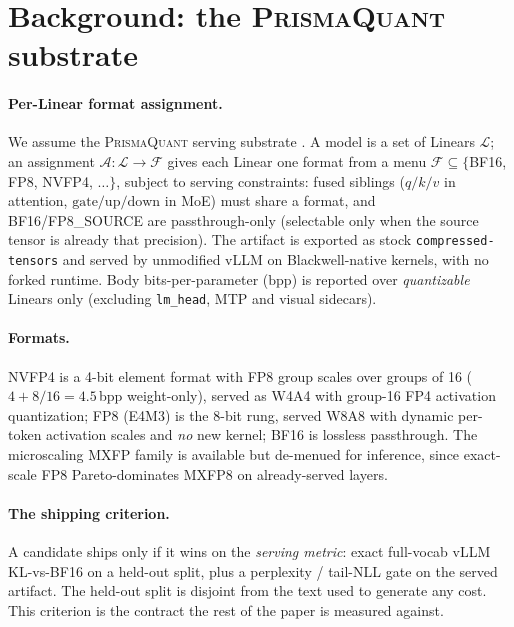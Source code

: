 \documentclass[11pt]{article}
\theoremstyle{plain}
\theoremstyle{definition}
\newcommand{\bpp}{\mathrm{bpp}}
\newcommand{\Linears}{\mathcal{L}}
\newcommand{\Formats}{\mathcal{F}}
\newcommand{\Assignment}{\mathcal{A}}
\begin{document}
\section{Background: the \textsc{PrismaQuant} substrate}\label{sec:background}

\paragraph{Per-Linear format assignment.} We assume the \textsc{PrismaQuant}
serving substrate \cite{prismaquant}. A model is a set of Linears
$\Linears$; an assignment $\Assignment:\Linears\to\Formats$ gives each Linear one
format from a menu $\Formats\subseteq\{$BF16, FP8, NVFP4, $\dots\}$, subject to
serving constraints: fused siblings ($q/k/v$ in attention,
$\mathrm{gate}/\mathrm{up}/\mathrm{down}$ in MoE) must share a format, and
BF16/FP8\_SOURCE are passthrough-only (selectable only when the source tensor is
already that precision). The artifact is exported as stock
\texttt{compressed-tensors} and served by unmodified vLLM \cite{vllm} on
Blackwell-native kernels, with no forked runtime. Body bits-per-parameter
($\bpp$) is reported over \emph{quantizable} Linears only (excluding
\texttt{lm\_head}, MTP and visual sidecars).

\paragraph{Formats.} NVFP4 \cite{nvfp4_blackwell} is a 4-bit element format with
FP8 group scales over groups of 16 ($4 + 8/16 = 4.5$\,bpp weight-only), served
as W4A4 with group-16 FP4 activation quantization; FP8 (E4M3) is the 8-bit rung,
served W8A8 with dynamic per-token activation scales and \emph{no} new kernel;
BF16 is lossless passthrough. The microscaling MXFP family \cite{ocp_mx} is
available but de-menued for inference, since exact-scale FP8 Pareto-dominates
MXFP8 on already-served layers.

\paragraph{The shipping criterion.} A candidate ships only if it wins on the
\emph{serving metric}: exact full-vocab vLLM KL-vs-BF16 on a held-out split,
plus a perplexity / tail-NLL gate on the served artifact. The held-out split is
disjoint from the text used to generate any cost. This criterion is the contract
the rest of the paper is measured against.
\end{document}
